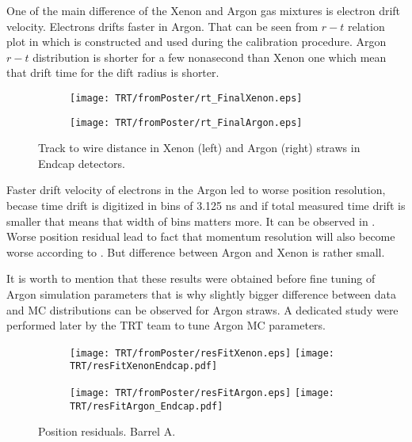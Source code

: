One of the main difference of the Xenon and Argon gas mixtures is electron drift velocity. Electrons drifts faster in Argon. 
That can be seen from $r-t$ relation plot in  which is constructed and used during the calibration procedure.
Argon $r-t$ distribution is shorter for a few nonasecond than Xenon one which mean that drift time for the dift radius is shorter.

\begin{figure}
\begin{subfigure}{.5\textwidth}
  \centering
  \texttt{[image: TRT/fromPoster/rt\_FinalXenon.eps]}
\end{subfigure}%
\begin{subfigure}{.5\textwidth}
  \centering
  \texttt{[image: TRT/fromPoster/rt\_FinalArgon.eps]}
\end{subfigure}

\caption{Track to wire distance in Xenon (left) and Argon (right) straws in Endcap detectors.}
  \label{fig:RT_xenon_argon}
\end{figure}

Faster drift velocity of electrons in the Argon led to worse position resolution,
becase time drift is digitized in bins of 3.125 ns and if total measured time drift is smaller that means that width of bins matters more.
It can be observed in . Worse position residual lead to fact that momentum resolution will also become worse according to
. But difference between Argon and Xenon is rather small.

It is worth to mention that these results were obtained before fine tuning of Argon simulation parameters that is why slightly bigger difference between 
data and MC distributions can be observed for Argon straws. A dedicated study were performed later by the TRT team to tune Argon MC parameters.

\begin{figure}

\begin{subfigure}{.5\textwidth}
  \centering
  \texttt{[image: TRT/fromPoster/resFitXenon.eps]}
  \texttt{[image: TRT/resFitXenonEndcap.pdf]}
\end{subfigure}%
\begin{subfigure}{.5\textwidth}
  \centering
  \texttt{[image: TRT/fromPoster/resFitArgon.eps]}
  \texttt{[image: TRT/resFitArgon\_Endcap.pdf]}
\end{subfigure}

\caption{Position residuals. Barrel A.}
  \label{fig:resFit}
\end{figure}

